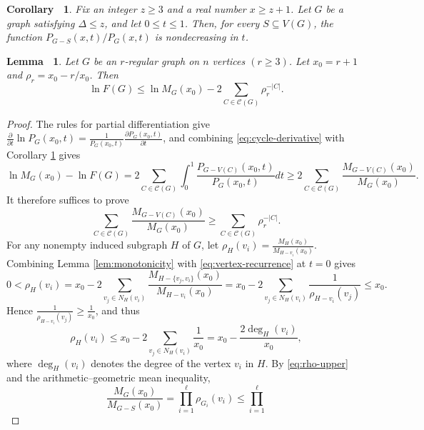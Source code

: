\documentclass[11pt, a4paper]{article}
\theoremstyle{plain}
\newtheorem{corollary}{Corollary\ }[section]
\newtheorem{lemma}{Lemma\ }[section]
\begin{document}
\begin{corollary}\label{cor:1}
Fix an integer $z\geq3$ and a real number $x\geq z+1$.
Let $G$ be a graph satisfying $\Delta \leq z$, and let $0\leq t\leq1$.
Then, for every $S\subseteq V(G)$, the function $P_{G-S}(x,t)/P_G(x,t)$ is nondecreasing in $t$.
\end{corollary}

\begin{lemma}\label{lemma:cycle-loss}
Let $G$ be an $r$-regular graph on $n$ vertices $(r\geq3)$. Let $x_0=r+1$ and
$\rho_r=x_0-r/x_0$.
Then
\begin{equation}\label{eq:cycle-loss}
 \ln F(G)
 \leq\ln M_G(x_0)-2\sum_{C\in\mathcal{C}(G)}\rho_r^{-|C|}.
\end{equation}
\end{lemma}
\begin{proof}
The rules for partial differentiation give
$\frac{\partial}{\partial t} \ln P_G(x_0,t) = \frac{1}{P_G(x_0,t)} \frac{\partial P_G(x_0,t)}{\partial t}$,
and combining \eqref{eq:cycle-derivative} with Corollary \ref{cor:1} gives
\begin{equation}\label{eq:loss-first}
\ln M_G(x_0) - \ln F(G) 
= 2 \sum_{C \in \mathcal{C}(G)} \int_0^1 
\frac{P_{G-V(C)}(x_0,t)}{P_G(x_0,t)} dt  
\ge 2 \sum_{C \in \mathcal{C}(G)} 
\frac{M_{G-V(C)}(x_0)}{M_G(x_0)}.
\end{equation}
It therefore suffices to prove
\begin{equation}\label{eq:25}
\sum_{C \in \mathcal{C}(G)} 
\frac{M_{G-V(C)}(x_0)}{M_G(x_0)}
\geq \sum_{C\in\mathcal{C}(G)}\rho_r^{-|C|}.
\end{equation}
For any nonempty induced subgraph $H$ of $G$,
let $\rho_H(v_i)=\frac{M_H(x_0)}{M_{H-v_i}(x_0)}$.
Combining Lemma \ref{lem:monotonicity} with \eqref{eq:vertex-recurrence} at $t=0$ gives
\[
 0<\rho_H(v_i)
 =x_0 - 2 \sum_{v_j\in N_H(v_i)} \frac{M_{H-\{v_j,v_i\}}(x_0)}{M_{H-v_i}(x_0)}
 =x_0-2\sum_{v_j\in N_H(v_i)}\frac1{\rho_{H-v_i}(v_j)}\leq x_0.
\]
Hence $\frac{1}{\rho_{H-v_i}(v_j)} \geq \frac{1}{x_0}$,
and thus
\begin{equation}\label{eq:rho-upper}
 \rho_H(v_i) \leq x_0 - 2 \sum_{v_j\in N_H(v_i)}\frac1{x_0} = x_0-\frac{2\deg_H(v_i)}{x_0},
\end{equation}
where $\deg_H(v_i)$ denotes the degree of the vertex $v_i$ in $H$.
By \eqref{eq:rho-upper} and the arithmetic--geometric mean inequality,
\begin{equation}
\frac{M_G(x_0)}{M_{G-S}(x_0)}
=
\prod_{i=1}^{\ell}\rho_{G_i}(v_i)
\leq
\prod_{i=1}^{\ell}

\end{equation}
\end{proof}
\end{document}
